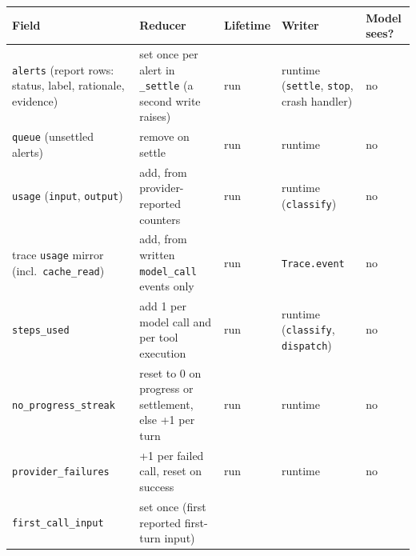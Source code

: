 \documentclass[
  10pt,
]{article}
\newcounter{none} %
\begin{document}
{\def\LTcaptype{none} %
\begin{longtable}[]{@{}
  >{\raggedright\arraybackslash}p{}
  >{\raggedright\arraybackslash}p{}
  >{\raggedright\arraybackslash}p{}
  >{\raggedright\arraybackslash}p{}
  >{\raggedright\arraybackslash}p{}@{}}
\toprule\noalign{}
\begin{minipage}[b]{\linewidth}\raggedright
Field
\end{minipage} & \begin{minipage}[b]{\linewidth}\raggedright
Reducer
\end{minipage} & \begin{minipage}[b]{\linewidth}\raggedright
Lifetime
\end{minipage} & \begin{minipage}[b]{\linewidth}\raggedright
Writer
\end{minipage} & \begin{minipage}[b]{\linewidth}\raggedright
Model sees?
\end{minipage} \\
\midrule\noalign{}
\endhead
\bottomrule\noalign{}
\endlastfoot
\texttt{alerts} (report rows: status, label, rationale, evidence) & set
once per alert in \texttt{\_settle} (a second write raises) & run &
runtime (\texttt{settle}, \texttt{stop}, crash handler) & no \\
\texttt{queue} (unsettled alerts) & remove on settle & run & runtime &
no \\
\texttt{usage} (\texttt{input}, \texttt{output}) & add, from
provider-reported counters & run & runtime (\texttt{classify}) & no \\
trace \texttt{usage} mirror (incl.~\texttt{cache\_read}) & add, from
written \texttt{model\_call} events only & run & \texttt{Trace.event} &
no \\
\texttt{steps\_used} & add 1 per model call and per tool execution & run
& runtime (\texttt{classify}, \texttt{dispatch}) & no \\
\texttt{no\_progress\_streak} & reset to 0 on progress or settlement,
else +1 per turn & run & runtime & no \\
\texttt{provider\_failures} & +1 per failed call, reset on success & run
& runtime & no \\
\texttt{first\_call\_input} & set once (first reported first-turn input)

\end{longtable}}
\end{document}
